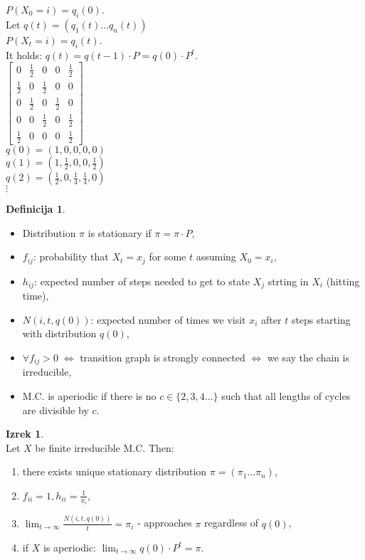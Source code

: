 \documentclass[a4paper, 12pt]{book}
\theoremstyle{definition}
\newtheorem{defn}[counter]{Definicija}
\newtheorem{theorem}[counter]{Izrek}
\theoremstyle{remark}
\begin{document}
$P(X_0 = i) = q_i(0)$. \\
Let $q(t) = (q_1(t) \dots q_n(t))$ \\
$P(X_t = i) = q_i(t)$. \\
It holds: $q(t) = q(t-1) \cdot P = q(0) \cdot P^t$. \\
$\begin{bmatrix}
  0 & \frac{1}{2} & 0 & 0 & \frac{1}{2} \\
  \frac{1}{2} & 0 & \frac{1}{2} & 0 & 0 \\
  0 & \frac{1}{2} & 0 & \frac{1}{2} & 0 \\
  0 & 0 & \frac{1}{2} & 0 & \frac{1}{2} \\
  \frac{1}{2} & 0 & 0 & 0 & \frac{1}{2}
\end{bmatrix}$ \\
$q(0) = (1, 0, 0, 0, 0)$ \\
$q(1) = (1, \frac{1}{2}, 0, 0, \frac{1}{2})$ \\
$q(2) = (\frac{1}{2}, 0, \frac{1}{4}, \frac{1}{4}, 0)$ \\
$\vdots$ \\
\begin{defn} \text{} \\
  \begin{itemize}
    \item Distribution $\pi$ is stationary if $\pi = \pi \cdot P$,
    \item $f_{ij}$: probability that $X_t = x_j$ for some $t$ assuming $X_0 = x_i$,
    \item $h_{ij}$: expected number of steps needed to get to state $X_j$ strting in $X_i$ (hitting time),
    \item $N(i, t, q(0))$: expected number of times we visit $x_i$ after $t$ steps starting with distribution $q(0)$,
    \item $\forall f_{ij} > 0 \; \iff$ transition graph is strongly connected $\iff$ we say the chain is irreducible,
    \item M.C. is aperiodic if there is no $c \in \{2, 3, 4 \dots\}$ such that all lengths of cycles are divisible by $c$.
  \end{itemize}
\end{defn}
\begin{theorem} \text{} \\
  Let $X$ be finite irreducible M.C. Then:
  \begin{enumerate}[label=\alph*)]
    \item there exists unique stationary distribution $\pi = (\pi_1 \dots \pi_n)$,
    \item $f_{ii} = 1, h_{ii} = \frac{1}{\pi_i}$,
    \item $\lim_{t \to \infty} \frac{N(i, t, q(0))}{t} = \pi_i$ - approaches $\pi$ regardless of $q(0)$,
    \item if $X$ is aperiodic: $\lim_{t \to \infty} q(0) \cdot P^t = \pi$. 
  \end{enumerate}
\end{theorem}
\end{document}
